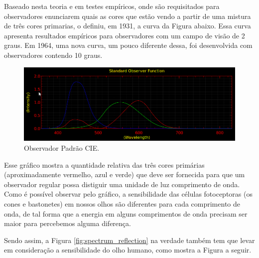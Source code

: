 \par
Baseado nesta teoria e em testes empíricos, onde são requisitados para
observadores enunciarem quais as cores que estão vendo a partir de uma mistura
de três cores primarias, o  definiu, em 1931,
a curva da Figura abaixo. Essa curva apresenta resultados empíricos para
observadores com um campo de visão de 2 graus. Em 1964, uma nova curva, um
pouco diferente dessa, foi desenvolvida com observadores contendo 10 graus.

\begin{figure}[!htb]
     \centering
     \includegraphics[scale=0.8]{img/cie_std_observer.png}
     \caption{Observador Padrão CIE.}
     \label{fig:standard_observer}
\end{figure}

\par
Esse gráfico mostra a quantidade relativa das três cores primárias
(aproximadamente vermelho, azul e verde) que deve ser fornecida para que um
observador regular possa distiguir uma unidade de luz comprimento de onda. Como
é possível observar pelo gráfico, a sensibilidade das células fotoceptoras
(os cones e bastonetes) em nossos olhos são diferentes para cada comprimento de
onda, de tal forma que a energia em alguns comprimentos de onda precisam ser
maior para percebemos alguma diferença.

\par
Sendo assim, a Figura \ref{fig:spectrum_reflection} na verdade também tem que
levar em consideração a sensibilidade do olho humano, como mostra a Figura a
seguir.

